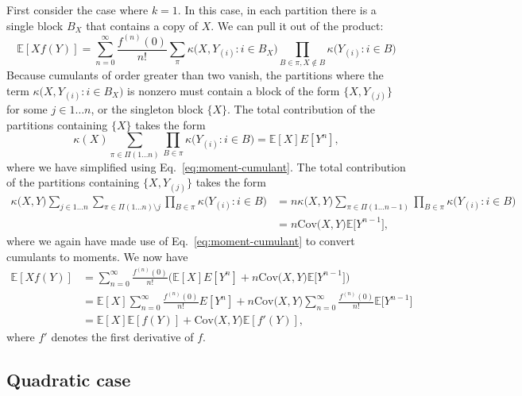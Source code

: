\documentclass{article}
\theoremstyle{plain}
\theoremstyle{definition}
\theoremstyle{remark}
\newcommand{\E}{\mathbb{E}}
\begin{document}
First consider the case where $k = 1$. In this case, in each partition there is a single block $B_X$ that contains a copy of $X$. We can pull it out of the product:
\begin{equation}
    \E[X f(Y)] = \sum_{n = 0}^{\infty} \frac{f^{(n)}(0)}{n!} \sum_{\pi} \kappa \big ( X, Y_{(i)} : i \in B_X \big ) \prod_{B \in \pi, X \notin B} \kappa \big ( Y_{(i)} : i \in B \big )
\end{equation}
Because cumulants of order greater than two vanish, the partitions where the term $\kappa \big ( X, Y_{(i)} : i \in B_X \big )$ is nonzero must contain a block of the form $\{ X, Y_{(j)} \}$ for some $j \in 1 \ldots n$, or the singleton block $\{ X \}$. The total contribution of the partitions containing $\{ X \}$ takes the form
\begin{equation}
    \kappa(X) \sum_{\pi \in \Pi(1 \ldots n)} \prod_{B \in \pi} \kappa \big ( Y_{(i)} : i \in B \big ) = \E[X] E[Y^n],
\end{equation}
where we have simplified using Eq.~\ref{eq:moment-cumulant}. The total contribution of the partitions containing $\{ X, Y_{(j)} \}$ takes the form
\begin{align}
    \kappa \big ( X, Y \big ) \sum_{j \in 1 \ldots n} \sum_{\pi \in \Pi(1 \ldots n) \setminus j} \prod_{B \in \pi} \kappa \big ( Y_{(i)} : i \in B \big ) &= n \kappa \big ( X, Y \big ) \sum_{\pi \in \Pi(1 \ldots n - 1)} \prod_{B \in \pi} \kappa \big ( Y_{(i)} : i \in B \big ) \\
    &= n \mathrm{Cov} \big ( X, Y \big ) \E \big [ Y^{n - 1} \big ],
\end{align}
where we again have made use of Eq.~\ref{eq:moment-cumulant} to convert cumulants to moments. We now have
\begin{align}
    \E[X f(Y)] &= \sum_{n = 0}^{\infty} \frac{f^{(n)}(0)}{n!} \Big ( \E[X] E[Y^n] + n \mathrm{Cov} \big ( X, Y \big ) \E \big [ Y^{n - 1} \big ] \Big ) \\
    &= \E[X] \sum_{n = 0}^{\infty} \frac{f^{(n)}(0)}{n!} E[Y^n] + n \mathrm{Cov} \big ( X, Y \big ) \sum_{n = 0}^{\infty} \frac{f^{(n)}(0)}{n!} \E \big [ Y^{n - 1} \big ] \\
    & = \E[X] \E[f(Y)] + \mathrm{Cov} \big ( X, Y \big ) \E[f'(Y)],
\end{align}
where $f'$ denotes the first derivative of $f$.

\subsection{Quadratic case}
\end{document}
